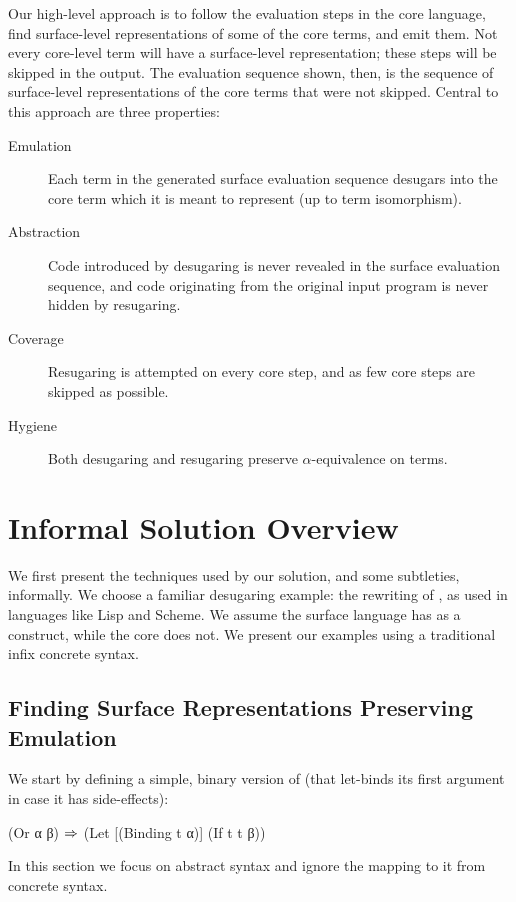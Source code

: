 Our high-level approach is to follow the evaluation steps in the core
language, find surface-level representations of some of the core
terms, and emit them. Not every core-level term will have a
surface-level representation; these steps will be skipped in the
output. The evaluation sequence shown, then, is the sequence of
surface-level representations of the core terms that were not
skipped. Central to this approach are three properties:

\begin{description}
\item[Emulation] Each term in the generated surface evaluation
  sequence desugars into the core term which it is meant to represent
  (up to term isomorphism).
\item[Abstraction] Code introduced by desugaring is never revealed in the
  surface evaluation sequence, and code originating from the original
  input program is never hidden by resugaring.
\item[Coverage] Resugaring is attempted on every core step, and as few
  core steps are skipped as possible.
\item[Hygiene] Both desugaring and resugaring preserve
  $\alpha$-equivalence on terms.
\end{description}

\section{Informal Solution Overview}
\label{sec:reval-exposition}

We first present the techniques used by our solution, and some subtleties,
informally. We choose a familiar desugaring example: the rewriting
of , as used in languages like Lisp and Scheme. We assume
the surface language has  as a construct, while the core does
not. We present our examples using a traditional infix concrete syntax.

\subsection{Finding Surface Representations Preserving Emulation}

We start by defining a simple, binary version of  (that
let-binds its first argument in case it has side-effects):
\begin{Codes}
(Or α β) \(\Rightarrow\) (Let [(Binding t α)]
                 (If t t β))
\end{Codes}
In this section we focus on abstract syntax and ignore
the mapping to it from concrete syntax.

